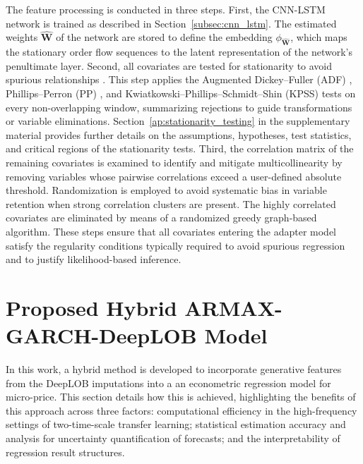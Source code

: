 \documentclass[10pt,a4paper,oneside]{article}
\providecommand{\DIFaddtex}[1]{{\protect\color{blue} \sf #1}} %
\providecommand{\DIFdeltex}[1]{{\protect\color{red} \scriptsize #1}} %
\providecommand{\DIFaddbegin}{} %
\providecommand{\DIFaddend}{} %
\providecommand{\DIFdelbegin}{} %
\providecommand{\DIFdelend}{} %
\providecommand{\DIFadd}[1]{\texorpdfstring{\DIFaddtex{#1}}{#1}} %
\providecommand{\DIFdel}[1]{\texorpdfstring{\DIFdeltex{#1}}{}} %
\newcommand{\DIFscaledelfig}{0.5}
\newlength{\DIFdelgraphicswidth} %
\newlength{\DIFdelgraphicsheight} %
\newcommand{\DIFaddincludegraphics}[2][]{{\color{blue}\fbox{\DIFOincludegraphics[#1]{#2}}}} %
\newcommand{\DIFdelincludegraphics}[2][]{%
\sbox{\DIFdelgraphicsbox}{\DIFOincludegraphics[#1]{#2}}%
\settoboxwidth{\DIFdelgraphicswidth}{\DIFdelgraphicsbox} %
\settoboxtotalheight{\DIFdelgraphicsheight}{\DIFdelgraphicsbox} %
\scalebox{\DIFscaledelfig}{%
\parbox[b]{\DIFdelgraphicswidth}{\usebox{\DIFdelgraphicsbox}\\[-\baselineskip] \rule{\DIFdelgraphicswidth}{0em}}\llap{\resizebox{\DIFdelgraphicswidth}{\DIFdelgraphicsheight}{%
\setlength{\unitlength}{\DIFdelgraphicswidth}%
\begin{picture}(1,1)%
\thicklines\linethickness{2pt} %
{\color[rgb]{1,0,0}\put(0,0){\framebox(1,1){}}}%
{\color[rgb]{1,0,0}\put(0,0){\line( 1,1){1}}}%
{\color[rgb]{1,0,0}\put(0,1){\line(1,-1){1}}}%
\end{picture}%
}\hspace*{3pt}}} %
} %
\DeclareRobustCommand{\DIFaddbegin}{\DIFOaddbegin \let\includegraphics\DIFaddincludegraphics} %
\DeclareRobustCommand{\DIFaddend}{\DIFOaddend \let\includegraphics\DIFOincludegraphics} %
\DeclareRobustCommand{\DIFdelbegin}{\DIFOdelbegin \let\includegraphics\DIFdelincludegraphics} %
\DeclareRobustCommand{\DIFdelend}{\DIFOaddend \let\includegraphics\DIFOincludegraphics} %
\begin{document}
The feature processing is conducted in three steps. First, the CNN-LSTM network is trained as described in Section~\ref{subsec:cnn_lstm}. The estimated weights $\hat{\mathbf{W}}$ of the network are stored to define the embedding $\phi_{\hat{\mathbf{W}}}$, which maps the stationary order flow sequences to the latent representation of the network's penultimate layer. Second, all covariates are tested for stationarity to avoid spurious relationships \cite{granger1974spurious, phillips1986understanding}. This step applies the Augmented Dickey--Fuller (ADF) \cite{said1984testing, hamilton_time_1994, banerjee1993co}, Phillips--Perron (PP) \cite{phillips1986understanding, hamilton_time_1994, banerjee1993co}, and Kwiatkowski--Phillips--Schmidt--Shin (KPSS) \cite{kwiatkowski1992testing} tests on every non-overlapping window, summarizing rejections to guide transformations or variable eliminations. Section~\ref{ap:stationarity_testing} in the supplementary material provides further details on the assumptions, hypotheses, test statistics, and critical regions of the stationarity tests. Third, the correlation matrix of the remaining covariates is examined to identify and mitigate multicollinearity by removing variables whose pairwise correlations exceed a user-defined absolute threshold. Randomization is employed to avoid systematic bias in variable retention when strong correlation clusters are present. The highly correlated covariates are eliminated by means of a randomized greedy graph-based algorithm. These steps ensure that all covariates entering the adapter model satisfy the regularity conditions typically required to avoid spurious regression and to justify likelihood-based inference.

\section{Proposed Hybrid ARMAX-GARCH-DeepLOB Model}
\label{subsec:armax_garch_paper}
In this work, a hybrid method is developed to incorporate generative features from the DeepLOB imputations into \DIFdelbegin \DIFdel{a }\DIFdelend \DIFaddbegin \DIFadd{an }\DIFaddend econometric regression model for micro-price. This section details how this is achieved, highlighting the benefits of this approach across three factors: computational efficiency in the high-frequency settings of two-time-scale transfer learning; statistical estimation accuracy and analysis for uncertainty quantification of forecasts; and the interpretability of regression result structures.
\end{document}
